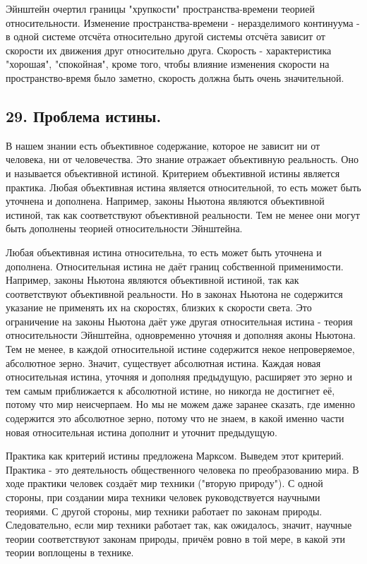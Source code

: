 \documentclass[a4paper, 12pt]{article}
\begin{document}
Эйнштейн очертил границы "хрупкости" пространства-времени теорией относительности.
Изменение пространства-времени - неразделимого континуума - в одной системе отсчёта относительно другой системы отсчёта зависит от скорости их движения друг относительно друга. Скорость - характеристика "хорошая", "спокойная", кроме того, чтобы влияние изменения скорости на пространство-время было заметно, скорость должна быть очень значительной.

\subsection*{\textbf{29. Проблема истины.}}

В нашем знании есть объективное содержание, которое не зависит ни от человека, ни от человечества.
Это знание отражает объективную реальность.
Оно и называется объективной истиной.
Критерием объективной истины является практика.
Любая объективная истина является относительной, то есть может быть уточнена и дополнена.
Например, законы Ньютона являются объективной истиной, так как соответствуют объективной реальности.
Тем не менее они могут быть дополнены теорией относительности Эйнштейна.

Любая объективная истина относительна, то есть может быть уточнена и дополнена.
Относительная истина не даёт границ собственной применимости.
Например, законы Ньютона являются объективной истиной, так как соответствуют объективной реальности.
Но в законах Ньютона не содержится указание не применять их на скоростях, близких к скорости света.
Это ограничение на законы Ньютона даёт уже другая относительная истина - теория относительности Эйнштейна, одновременно уточняя и дополняя аконы Ньютона.
Тем не менее, в каждой относительной истине содержится некое непроверяемое, абсолютное зерно.
Значит, существует абсолютная истина.
Каждая новая относительная истина, уточняя и дополняя предыдущую, расширяет это зерно и тем самым приближается к абсолютной истине, но никогда не достигнет её, потому что мир неисчерпаем.
Но мы не можем даже заранее сказать, где именно содержится это абсолютное зерно, потому что не знаем, в какой именно части новая относительная истина дополнит и уточнит предыдущую.


Практика как критерий истины предложена Марксом.
Выведем этот критерий.
Практика - это деятельность общественного человека по преобразованию мира.
В ходе практики человек создаёт мир техники ("вторую природу").
С одной стороны, при создании мира техники человек руководствуется научными теориями.
С другой стороны, мир техники работает по законам природы.
Следовательно, если мир техники работает так, как ожидалось, значит, научные теории соответствуют законам природы, причём ровно в той мере, в какой эти теории воплощены в технике.
\end{document}
